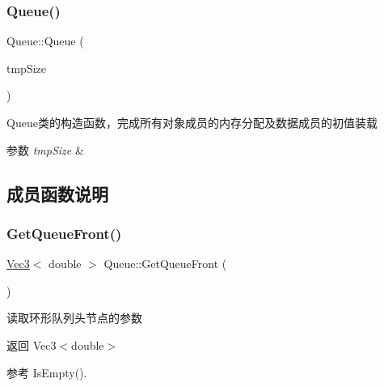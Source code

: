 \subsubsection{\texorpdfstring{Queue()}{Queue()}}
{\footnotesize\ttfamily Queue\+::\+Queue (\begin{DoxyParamCaption}\item[{int}]{tmp\+Size }\end{DoxyParamCaption})\hspace{0.3cm}{\ttfamily [explicit]}}



Queue类的构造函数，完成所有对象成员的内存分配及数据成员的初值装载 


\begin{DoxyParams}{参数}
{\em tmp\+Size} & \\
\hline
\end{DoxyParams}


\subsection{成员函数说明}
\mbox{\label{classquadruped_1_1Queue_a27bcc9cd76bf26fdd90946a95a7a62c9}} 
\subsubsection{\texorpdfstring{Get\+Queue\+Front()}{GetQueueFront()}}
{\footnotesize\ttfamily \hyperlink{cppTypes_8h_a65c27bf97693676535dd0b30ea0ad399}{Vec3}$<$ double $>$ Queue\+::\+Get\+Queue\+Front (\begin{DoxyParamCaption}\item[{void}]{ }\end{DoxyParamCaption})}



读取环形队列头节点的参数 

\begin{DoxyReturn}{返回}
Vec3$<$double$>$ 
\end{DoxyReturn}


参考 Is\+Empty().

\mbox{\label{classquadruped_1_1Queue_a08fe0a35aeb035bf663e89fbbd87038b}} 
